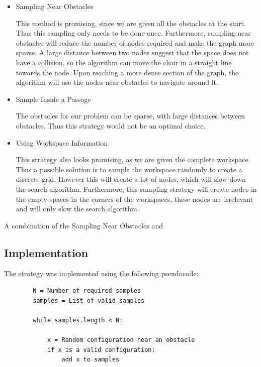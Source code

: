 \documentclass[12pt]{article}
\begin{document}
    \begin{itemize}
        \item Sampling Near Obstacles
        
            This method is promising, since we are given all the obstacles at the start. Thus this sampling only needs to be done once. Furthermore, sampling near obstacles will reduce the number of nodes required and make the graph more sparse. 
            A large distance between two nodes suggest that the space does not have a collision, so the algorithm can move the chair in a straight line towards the node.
            Upon reaching a more dense section of the graph, the algorithm will use the nodes near obstacles to navigate around it.

        \item Sample Inside a Passage

            The obstacles for our problem can be sparse, with large distances between obstacles. Thus this strategy would not be an optimal choice.

        \item Using Workspace Information

            This strategy also looks promising, as we are given the complete workspace. Thus a possible solution is to sample the workspace randomly to create a discrete grid. However this will create a lot of nodes, which will slow down the search algorithm.
            Furthermore, this sampling strategy will create nodes in the empty spaces in the corners of the workspaces, these nodes are irrelevant and will only slow the search algorithm.
    \end{itemize}

    A combination of the Sampling Near Obstacles and 

    \subsection{Implementation}

    The strategy was implemented using the following pseudocode:

    \begin{lstlisting}
        N = Number of required samples
        samples = List of valid samples

        while samples.length < N:
            
            x = Random configuration near an obstacle
            if x is a valid configuration:
                add x to samples

    \end{lstlisting}
\end{document}
